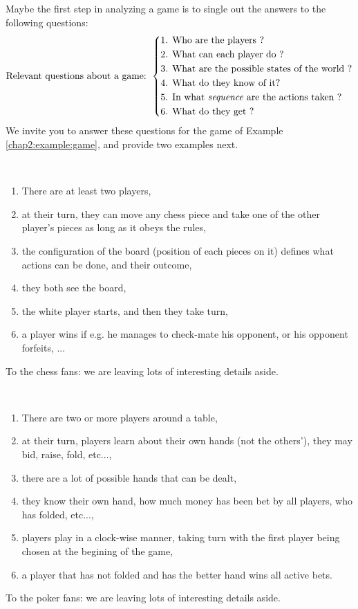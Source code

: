Maybe the first step in analyzing a game is to single out the answers to the following questions:
\begin{equation*}
\text{Relevant questions about a game: }
\left \{
\begin{aligned}
& \text{{1. Who are the players ?}} \\
& \text{{2. What can each player do ?}} \\
&  \text{{3. What are the possible states of the world ?}}\\
& \text{{4. What do they know of it?}}\\
& \text{{5. In what \emph{sequence} are the actions taken ?}}\\
& \text{{6. What do they get ?}}
\end{aligned} \right.
\end{equation*}
We invite you to answer these questions for the game of Example \ref{chap2:example:game}, and provide two examples next.

\begin{example}
$\,$\\
\begin{enumerate}
\item There are at least two players,
\item at their turn, they can move any chess piece and take one of the other player's pieces as long as it obeys the rules,
\item the configuration of the board (position of each pieces on it) defines what actions can be done, and their outcome,
\item they both see the board,
\item the white player starts, and then they take turn,
\item a player wins if e.g. he manages to check-mate his opponent, or his opponent forfeits, ...
\end{enumerate}
To the chess fans: we are leaving lots of interesting details aside.
\end{example}
\begin{example}
$\,$\\
\begin{enumerate}
\item There are two or more players around a table,
\item at their turn, players learn about their own hands (not the others'), they may bid, raise, fold, etc...,
\item there are a lot of possible hands that can be dealt,
\item they know their own hand, how much money has been bet by all players, who has folded, etc...,
\item players play in a clock-wise manner, taking turn with the first player being chosen at the begining of the game,
\item a player that has not folded and has the better hand wins all active bets.
\end{enumerate}
To the poker fans: we are leaving lots of interesting details aside.
\end{example}


